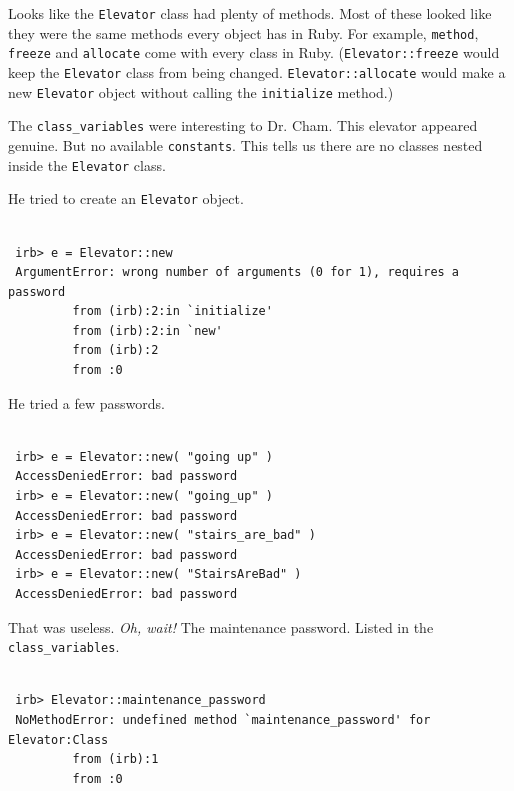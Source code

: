 \documentclass[10pt,twoside]{report}
\begin{document}
Looks like the \lstinline[breaklines=true]|Elevator| class had plenty
of methods.  Most of these looked like they were the same methods
every object has in Ruby.  For example,
\lstinline[breaklines=true]|method|,
\lstinline[breaklines=true]|freeze| and
\lstinline[breaklines=true]|allocate| come with every class in Ruby.
(\lstinline[breaklines=true]|Elevator::freeze| would keep the
\lstinline[breaklines=true]|Elevator| class from being changed.
\lstinline[breaklines=true]|Elevator::allocate| would make a new
\lstinline[breaklines=true]|Elevator| object without calling the
\lstinline[breaklines=true]|initialize| method.)

The \lstinline[breaklines=true]|class_variables| were interesting to
Dr. Cham.  This elevator appeared genuine. But no available
\lstinline[breaklines=true]|constants|.  This tells us there are no
classes nested inside the \lstinline[breaklines=true]|Elevator| class.

He tried to create an \lstinline[breaklines=true]|Elevator| object.


\begin{lstlisting}

 irb> e = Elevator::new
 ArgumentError: wrong number of arguments (0 for 1), requires a password
         from (irb):2:in `initialize'
         from (irb):2:in `new'
         from (irb):2
         from :0

\end{lstlisting}


He tried a few passwords.


\begin{lstlisting}

 irb> e = Elevator::new( "going up" )
 AccessDeniedError: bad password
 irb> e = Elevator::new( "going_up" )
 AccessDeniedError: bad password
 irb> e = Elevator::new( "stairs_are_bad" )
 AccessDeniedError: bad password
 irb> e = Elevator::new( "StairsAreBad" )
 AccessDeniedError: bad password

\end{lstlisting}


That was useless.  {\em Oh, wait!}  The maintenance password.  Listed
in the \lstinline[breaklines=true]|class_variables|.


\begin{lstlisting}

 irb> Elevator::maintenance_password
 NoMethodError: undefined method `maintenance_password' for Elevator:Class
         from (irb):1
         from :0

\end{lstlisting}
\end{document}
